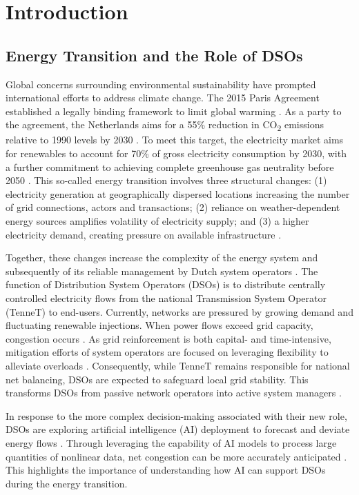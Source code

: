 \chapter{Introduction}
\label{ch:introduction}

\section{Energy Transition and the Role of DSOs}

Global concerns surrounding environmental sustainability have prompted international efforts to address climate change. The 2015 Paris Agreement established a legally binding framework to limit global warming \autocite{UNFCCC}. As a party to the agreement, the Netherlands aims for a 55\% reduction in CO\textsubscript{2} emissions relative to 1990 levels by 2030 \autocite{Government2025}. To meet this target, the electricity market aims for renewables to account for 70\% of gross electricity consumption by 2030, with a further commitment to achieving complete greenhouse gas neutrality before 2050 \autocite{Scheepers2022}. This so-called energy transition involves three structural changes: (1) electricity generation at geographically dispersed locations increasing the number of grid connections, actors and transactions; (2) reliance on weather-dependent energy sources amplifies volatility of electricity supply; and (3) a higher electricity demand, creating pressure on available infrastructure \autocite{Raineri2025, Peper2024, Nadel2019}.

Together, these changes increase the complexity of the energy system and subsequently of its reliable management by Dutch system operators \autocite{Zahraoui2025}. The function of Distribution System Operators (DSOs) is to distribute centrally controlled electricity flows from the national Transmission System Operator (TenneT) to end-users. Currently, networks are pressured by growing demand and fluctuating renewable injections. When power flows exceed grid capacity, congestion occurs \autocite{Pato2024, Jaskolski2025}. As grid reinforcement is both capital- and time-intensive, mitigation efforts of system operators are focused on leveraging flexibility to alleviate overloads \autocite{Fonteijn2019}. Consequently, while TenneT remains responsible for national net balancing, DSOs are expected to safeguard local grid stability. This transforms DSOs from passive network operators into active system managers \autocite{Zahraoui2025, Warneryd2025}.

In response to the more complex decision-making associated with their new role, DSOs are exploring artificial intelligence (AI) deployment to forecast and deviate energy flows \autocite{Ali2020}. Through leveraging the capability of AI models to process large quantities of nonlinear data, net congestion can be more accurately anticipated \autocite{Barja2021}. This highlights the importance of understanding how AI can support DSOs during the energy transition.

